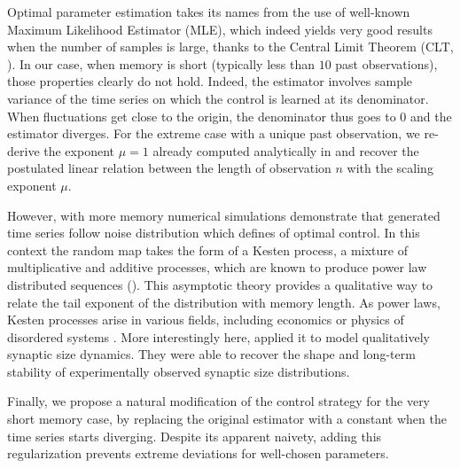 \documentclass[FinalReport.tex]{subfiles}
\begin{document}
Optimal parameter estimation takes its names from the use of well-known Maximum Likelihood Estimator (MLE), which indeed yields very good results when the number of samples is large, thanks to the Central Limit Theorem (CLT, \citet{CoxHink74}). In our case, when memory is short (typically less than $10$ past observations), those properties clearly do not hold. Indeed, the estimator involves sample variance of the time series on which the control is learned at its denominator. When fluctuations get close to the origin, the denominator thus goes to $0$ and the estimator diverges. For the extreme case with a unique past observation, we re-derive the exponent $\mu=1$ already computed analytically in \citet{FrontNanoScience} and recover the postulated linear relation between the length of observation $n$ with the scaling exponent $\mu$.
 
However, with more memory numerical simulations demonstrate 
that generated time series follow noise distribution which defines of optimal control. In this context the random map takes the form of a Kesten process, a mixture of multiplicative and additive processes, which are known to produce power law distributed sequences (\citet{kesten}). This asymptotic theory provides a qualitative way to relate the tail exponent of the distribution with memory length. As power laws, Kesten processes arise in various fields, including economics \cite{kesten-econ} or physics of disordered systems \cite{kesten-process-physics}. More interestingly here, \citet{kesten-synapses} applied it to model qualitatively synaptic size dynamics. They were able to recover the shape and long-term stability of experimentally observed synaptic size distributions. 


Finally, we propose a natural modification of the control strategy for the very short memory case, by replacing the original estimator with a constant when the time series starts diverging. Despite its apparent naivety, adding this regularization prevents extreme deviations for well-chosen parameters.
\begin{comment}

The guiding idea is to study the nature of the control methodology, and the dependence of the results on the length of the time series on which the control is learned. In particular,  the emerging power-​laws can be seen to be structurally similar to the denominator of the random variable at the origin of the introduction of the student t distribution. We want to test the conjecture that the effects found by Eurich and Pawelzik (2005) and Patzelt et al may in fact disappear in certain very relevant conditions that will be explained to the student.
	
\end{comment}


  
\end{document}
